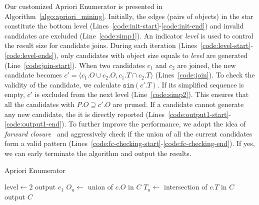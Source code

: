 Our customized Apriori Enumerator is presented in Algorithm~\ref{algo:apriori_mining}. Initially, the edges (pairs of objects) in the star constitute the bottom level (Lines~\ref{code:init-start}-\ref{code:init-end}) and invalid candidates are excluded (Line~\ref{code:simp1}). An indicator \emph{level} is used to control the result size for candidate joins. During each iteration (Lines~\ref{code:level-start}-\ref{code:level-ends}), only candidates with object size equals to \emph{level} are generated (Line~\ref{code:join-start}). When two candidates $c_1$ and $c_2$ are joined, the new candidate becomes $c'=\langle c_1.O \cup c_2.O, c_1.T\cap c_2.T\rangle$ (Lines~\ref{code:join}). To check the validity of the candidate, we calculate $\mathtt{sim}(c'.T)$. If its simplified sequence is empty, $c'$ is excluded from the next level (Line~\ref{code:simp2}). This ensures that all the candidates with $P.O\supseteq c'.O$ are pruned. If a candidate cannot generate any new candidate, the
it is directly reported (Lines~\ref{code:output1-start}-\ref{code:output1-end}).
To further improve the performance, we adopt the idea of \textit{forward closure}~\cite{wang2003closet+,pei2000closet} and  aggressively check if the union of all the current candidates form a valid pattern (Lines~\ref{code:fc-checking-start}-\ref{code:fc-checking-end}). If yes, we can early terminate the algorithm and output the results.

\begin{algorithm}[h]
\caption{Apriori Enumerator}
\label{algo:apriori_mining}
\begin{algorithmic}[1]
 \label{code:init-start}
 \label{code:simp1}
\EndIf 
\EndFor\label{code:init-end}
\State $\mathrm{level} \gets 2$ \label{code:level}
 \label{code:level-start}
		\label{code:join-start}	
			 \label{code:join}			
			 \label{code:simp2}
			\EndIf			
		\EndFor\label{code:join-end}
		 \label{code:output1-start}
				\State output $c_1$
			\EndIf
		\EndIf \label{code:output1-end}
	\EndFor
	\State $O_u \gets $ union of $c.O$ in $C$	\label{code:fc-checking-start}
	\State $T_u \gets $ intersection of $c.T$ in $C$	
		 \label{code:fc-checking}
	\EndIf \label{code:fc-checking-end}
\EndWhile\label{code:level-ends}
\State output $C$ \label{code:output2-end}
\end{algorithmic}
\end{algorithm}



